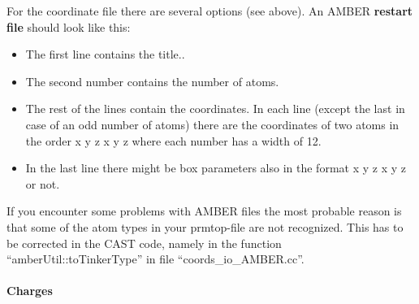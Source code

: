 \documentclass[10pt,a4paper]{article} %
\begin{document}
For the coordinate file there are several options (see above). An AMBER \textbf{restart file }should look like this:
\begin{itemize}
\item The first line contains the title..
\item The second number contains the number of atoms.
\item The rest of the lines contain the coordinates. In each line (except the last in case of an odd number of atoms) there are the coordinates of two atoms in the order x y z x y z where each number has a width of 12.
\item In the last line there might be box parameters also in the format x y z x y z or not.
\end{itemize}

If you encounter some problems with \ac{AMBER} files the most probable reason is that some of the atom types in your prmtop-file are not recognized. This has to be corrected in the \ac{CAST} code, namely in the function ``amberUtil::toTinkerType'' in file ``coords\_io\_AMBER.cc''.

\paragraph{Charges}
\end{document}
